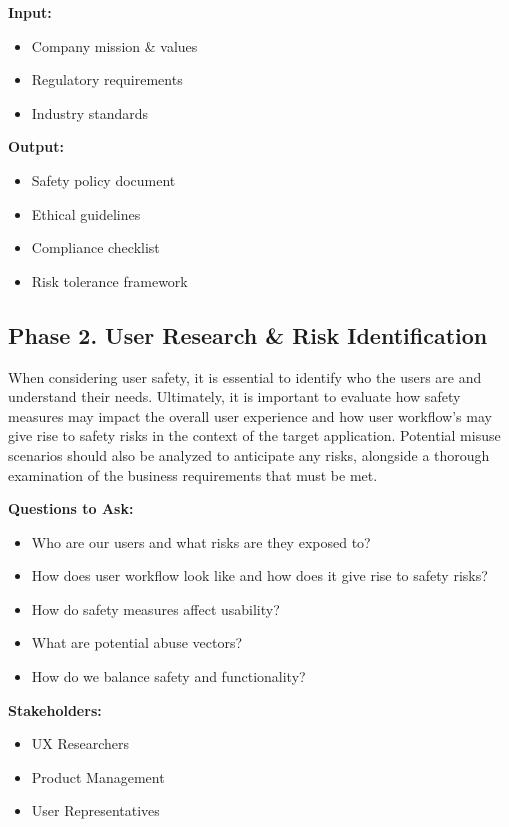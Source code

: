 \textbf{Input:}
\begin{itemize}
    \item Company mission \& values
    \item Regulatory requirements
    \item Industry standards
\end{itemize}

\textbf{Output:}
\begin{itemize}
    \item Safety policy document
    \item Ethical guidelines
    \item Compliance checklist
    \item Risk tolerance framework
\end{itemize}

\subsection{Phase 2. User Research \& Risk Identification}

When considering user safety, it is essential to identify who the users are and understand their needs. Ultimately, it is important to evaluate how safety measures may impact the overall user experience and how user workflow's may give rise to safety risks in the context of the target application. Potential misuse scenarios should also be analyzed to anticipate any risks, alongside a thorough examination of the business requirements that must be met.

\textbf{Questions to Ask:}
\begin{itemize}
    \item Who are our users and what risks are they exposed to?
    \item How does user workflow look like and how does it give rise to safety risks?
    \item How do safety measures affect usability?
    \item What are potential abuse vectors?
    \item How do we balance safety and functionality?
\end{itemize}

\textbf{Stakeholders:}
\begin{itemize}
    \item UX Researchers
    \item Product Management
    \item User Representatives
\end{itemize}

